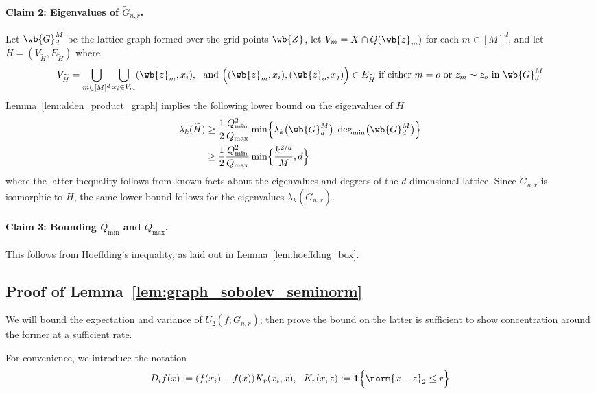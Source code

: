\documentclass{article}
\newcommand{\1}{\mathbf{1}}
\newcommand{\wt}[1]{\widetilde{#1}}
\theoremstyle{alden}
\theoremstyle{aldenthm}
\theoremstyle{definition}
\theoremstyle{remark}
\begin{document}
\paragraph{Claim 2: Eigenvalues of $\wt{G}_{n,r}$.}
Let $\wb{G}_d^{M}$ be the lattice graph formed over the grid points $\wb{Z}$, let $V_m = X \cap Q(\wb{z}_m)$ for each $m \in [M]^d$, and let $\wt{H} = (V_{\wt{H}}, E_{\wt{H}})$ where
\begin{equation*}
V_{\wt{H}} = \bigcup_{m \in [M]^d} \bigcup_{x_i \in V_m} (\wb{z}_m,x_i),~~ \textrm{and}~ \Bigl((\wb{z}_m,x_i),(\wb{z}_o,x_{j})\Bigr) \in E_{\wt{H}}~\textrm{if either $m = o$ or $z_m \sim z_o$ in $\wb{G}_d^{M}$} 
\end{equation*}
Lemma~\ref{lem:alden_product_graph} implies the following lower bound on the eigenvalues of $H$
\begin{align*}
\lambda_k(\wt{H}) & \geq \frac{1}{2} \frac{Q_{\min}^2}{Q_{\max}}\min\Bigl\{\lambda_k\bigl(\wb{G}_d^{M}\bigr),\deg_{\min}\bigl(\wb{G}_d^{M}\bigr)\Bigr\} \\
& \geq \frac{1}{2} \frac{Q_{\min}^2}{Q_{\max}}\min\Bigl\{\frac{k^{2/d}}{M},d\Bigr\}
\end{align*}
where the latter inequality follows from known facts about the eigenvalues and degrees of the $d$-dimensional lattice. Since $\wt{G}_{n,r}$ is isomorphic to $\wt{H}$, the same lower bound follows for the eigenvalues $\lambda_k(\wt{G}_{n,r})$. 

\paragraph{Claim 3: Bounding $Q_{\min}$ and $Q_{\max}$.}
This follows from Hoeffding's inequality, as laid out in Lemma~\ref{lem:hoeffding_box}.


\subsection{Proof of Lemma~\ref{lem:graph_sobolev_seminorm}}
We will bound the expectation and variance of $U_2(f;G_{n,r})$; then prove the bound on the latter is sufficient to show concentration around the former at a sufficient rate.

For convenience, we introduce the notation 
\begin{equation*}
D_if(x) := (f(x_i) - f(x)) K_r(x_i,x),~~ K_r(x,z) := \1\Bigl\{\norm{x - z}_2 \leq r \Bigr\}
\end{equation*}
\end{document}
